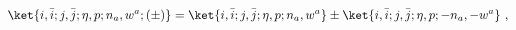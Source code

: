 \begin{equation}
\ket{i,\bar{i};j,\bar{j};\eta,p;n_a,w^a; (\pm)} =
\ket{i,\bar{i};j,\bar{j};\eta,p;n_a,w^a} \pm 
\ket{i,\bar{i};j,\bar{j};\eta,p;-n_a,-w^a} ~,
\end{equation}

